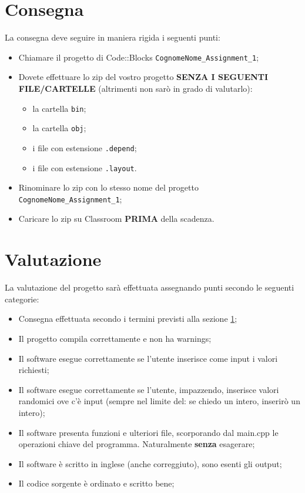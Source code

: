 \documentclass[addpoints]{exam}
\begin{document}
    \section{Consegna}
    \label{consegna}
    La consegna deve seguire in maniera rigida i seguenti punti:
    \begin{itemize}
        \item Chiamare il progetto di Code::Blocks \texttt{CognomeNome\_Assignment\_1};
        \item Dovete effettuare lo zip del vostro progetto \textbf{SENZA I SEGUENTI FILE/CARTELLE} (altrimenti non sarò in grado di valutarlo): 
        \begin{itemize}
            \item la cartella \texttt{bin};
            \item la cartella \texttt{obj};
            \item i file con estensione \texttt{.depend};
            \item i file con estensione \texttt{.layout}.
        \end{itemize}
        \item Rinominare lo zip con lo stesso nome del progetto \texttt{CognomeNome\_Assignment\_1};
        \item Caricare lo zip su Classroom \textbf{PRIMA} della scadenza.
    \end{itemize}

    \clearpage
    
    \section{Valutazione}
    La valutazione del progetto sarà effettuata assegnando punti secondo le seguenti categorie:
    \begin{itemize}
        \item Consegna effettuata secondo i termini previsti alla sezione \ref{consegna};
        \item Il progetto compila correttamente e non ha warnings;
        \item Il software esegue correttamente se l'utente inserisce come input i valori richiesti;
        \item Il software esegue correttamente se l'utente, impazzendo, inserisce valori randomici ove c'è input (sempre nel limite del: se chiedo un intero, inserirò un intero);
        \item Il software presenta funzioni e ulteriori file, scorporando dal main.cpp le operazioni chiave del programma. Naturalmente \textbf{senza} esagerare;
        \item Il software è scritto in inglese (anche correggiuto), sono esenti gli output;
        \item Il codice sorgente è ordinato e scritto bene;
    \end{itemize}
\end{document}
